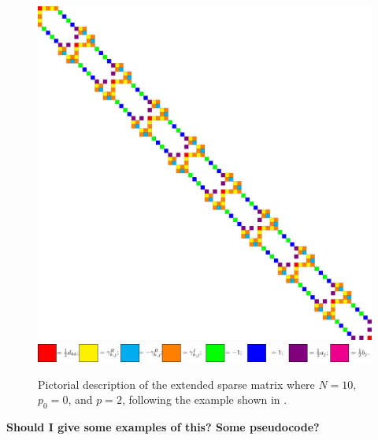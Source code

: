 \documentclass[manuscript, letterpaper]{aastex6}
\begin{document}
\begin{figure}[!htbp]
\begin{center}
\includegraphics[scale=0.175]{./twoterm.pdf}
\hspace{0.2in}
\includegraphics[scale=1.0]{./colorcode.pdf}
\end{center}
\caption{Pictorial description of the extended sparse matrix where $N=10$, $p_0=0$, and $p=2$, following
the example shown in \citet{Ambikasaran2015}.}
\label{matrix_structure}
\end{figure}

{\bf Should I give some examples of this?  Some pseudocode?}


\end{document}
